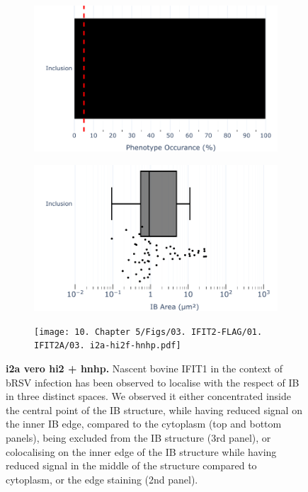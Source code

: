 \begin{figure}
    \begin{subfigure}{0.5\textwidth}
        \caption{}
        \includegraphics[width=1\linewidth]{10. Chapter 5/Figs/03. IFIT2-FLAG/01. IFIT2A/01. bar_i2a_hnhp.pdf} 
    \end{subfigure}
    \begin{subfigure}{0.5\textwidth}
        \caption{}
        \includegraphics[width=1\linewidth]{10. Chapter 5/Figs/03. IFIT2-FLAG/01. IFIT2A/02. box_i2a_hnhp.pdf}
    \end{subfigure}
    \begin{subfigure}{1\textwidth}
        \centering
        \caption{}
        \texttt{[image: 10. Chapter 5/Figs/03. IFIT2-FLAG/01. IFIT2A/03. i2a-hi2f-hnhp.pdf]}
    \end{subfigure}
    \caption[i2a vero hi2 + hnhp]{\textbf{i2a vero hi2 + hnhp.} Nascent bovine IFIT1 in the context of bRSV infection has been observed to localise with the respect of IB in three distinct spaces. We observed it either concentrated inside the central point of the IB structure, while having reduced signal on the inner IB edge, compared to the cytoplasm (top and bottom panels), being excluded from the IB structure (3rd panel), or colocalising on the inner edge of the IB structure while having reduced signal in the middle of the structure compared to cytoplasm, or the edge staining (2nd panel).}
    \label{fig:i2a vero hi2 + hnhp}
\end{figure}

